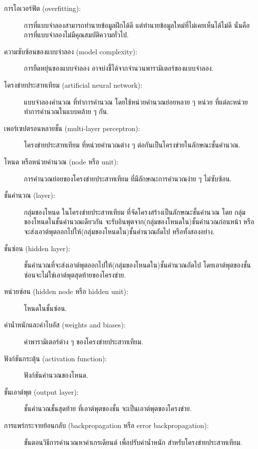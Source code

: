 \begin{description}
\item[การโอเวอร์ฟิต (overfitting):] 
การที่แบบจำลองสามารถทำนายข้อมูลฝึกได้ดี แต่ทำนายข้อมูลใหม่ที่ไม่เคยเห็นได้ไม่ดี
นั่นคือ การที่แบบจำลองไม่มีคุณสมบัติความทั่วไป.

\item[ความซับซ้อนของแบบจำลอง (model complexity):] 
การยืดหยุ่นของแบบจำลอง อาจบ่งชี้ได้จากจำนวนพารามิเตอร์ของแบบจำลอง.

\item[โครงข่ายประสาทเทียม (artificial neural network):]
แบบจำลองคำนวณ
ที่ทำการคำนวณ
โดยใช้หน่วยคำนวณย่อยหลาย ๆ หน่วย
ที่แต่ละหน่วยทำการคำนวณในแบบคล้าย ๆ กัน.

\item[เพอร์เซปตรอนหลายชั้น (multi-layer perceptron):]
โครงข่ายประสาทเทียม
ที่หน่วยคำนวณต่าง ๆ ต่อกันเป็นโครงข่ายในลักษณะชั้นคำนวณ.

\item[โหนด หรือหน่วยคำนวณ (node หรือ unit):]
การคำนวณย่อยของโครงข่ายประสาทเทียม
ที่มีลักษณะการคำนวณง่าย ๆ ไม่ซับซ้อน.

\item[ชั้นคำนวณ (layer):]
กลุ่มของโหนด ในโครงข่ายประสาทเทียม
ที่จัดโครงสร้างเป็นลักษณะชั้นคำนวณ
โดย
กลุ่มของโหนดในชั้นคำนวณเดียวกัน
จะรับอินพุตจาก(กลุ่มของโหนดใน)ชั้นคำนวณก่อนหน้า
หรือจะส่งเอาต์พุตออกไปให้(กลุ่มของโหนดใน)ชั้นคำนวณถัดไป
หรือทั้งสองอย่าง.

\item[ชั้นซ่อน (hidden layer):]
ชั้นคำนวณที่จะส่งเอาต์พุตออกไปให้(กลุ่มของโหนดใน)ชั้นคำนวณถัดไป
โดยเอาต์พุตของชั้นซ่อนจะไม่ใช่เอาต์พุตสุดท้ายของโครงข่าย.

\item[หน่วยซ่อน (hidden node หรือ hidden unit):]
โหนดในชั้นซ่อน.

\item[ค่าน้ำหนักและค่าไบอัส (weights and biases):]
ค่าพารามิเตอร์ต่าง ๆ ของโครงข่ายประสาทเทียม.

\item[ฟังก์ชันกระตุ้น (activation function):]
ฟังก์ชันคำนวณของโหนด.

\item[ชั้นเอาต์พุต (output layer):]
ชั้นคำนวณชั้นสุดท้าย
ที่เอาต์พุตของชั้น จะเป็นเอาต์พุตของโครงข่าย.

\item[การแพร่กระจายย้อนกลับ (backpropagation หรือ error backpropagation):]
ขั้นตอนวิธีการคำนวณหาค่าเกรเดียนต์ เพื่อปรับค่าน้ำหนัก สำหรับโครงข่ายประสาทเทียม.


\end{description}
